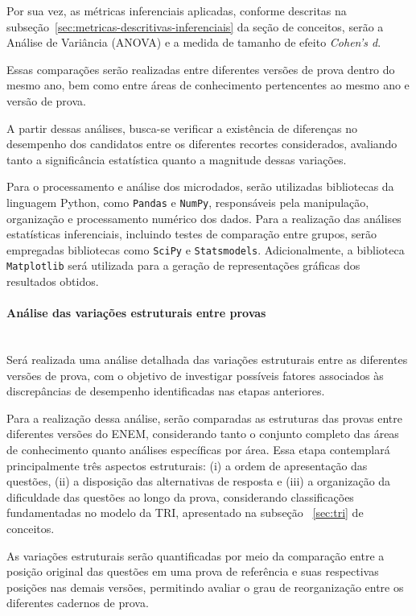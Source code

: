 \documentclass[a4paper,10pt, twocolumn]{article}
\begin{document}
Por sua vez, as métricas inferenciais aplicadas, conforme descritas na
subseção~\ref{sec:metricas-descritivas-inferenciais} da seção de conceitos, serão a Análise de Variância (ANOVA) e a medida de tamanho de efeito \textit{Cohen's d}.

Essas comparações serão realizadas entre diferentes versões de prova dentro do mesmo ano, bem como entre áreas de conhecimento pertencentes ao mesmo ano e versão de prova.

A partir dessas análises, busca-se verificar a existência de diferenças no desempenho dos candidatos entre os diferentes recortes considerados, avaliando tanto a significância estatística quanto a magnitude dessas variações.

Para o processamento e análise dos microdados, serão utilizadas bibliotecas da linguagem Python, como \texttt{Pandas} e \texttt{NumPy}, responsáveis pela manipulação, organização e processamento numérico dos dados. Para a realização das análises estatísticas inferenciais, incluindo testes de comparação entre grupos, serão empregadas bibliotecas como \texttt{SciPy} e \texttt{Statsmodels}. Adicionalmente, a biblioteca \texttt{Matplotlib} será utilizada para a geração de representações gráficas dos resultados obtidos.

\paragraph{Análise das variações estruturais entre provas}
\mbox{}\\
Será realizada uma análise detalhada das variações estruturais entre as diferentes versões de prova, com o objetivo de investigar possíveis fatores associados às discrepâncias de desempenho identificadas nas etapas anteriores.

Para a realização dessa análise, serão comparadas as estruturas das provas entre diferentes versões do ENEM, considerando tanto o conjunto completo das áreas de conhecimento quanto análises específicas por área. Essa etapa contemplará principalmente três aspectos estruturais: (i) a ordem de apresentação das questões, (ii) a disposição das alternativas de resposta e (iii) a organização da dificuldade das questões ao longo da prova, considerando classificações fundamentadas no modelo da TRI, apresentado na subseção ~\ref{sec:tri} de conceitos.

As variações estruturais serão quantificadas por meio da comparação entre a posição original das questões em uma prova de referência e suas respectivas posições nas demais versões, permitindo avaliar o grau de reorganização entre os diferentes cadernos de prova.
\end{document}
